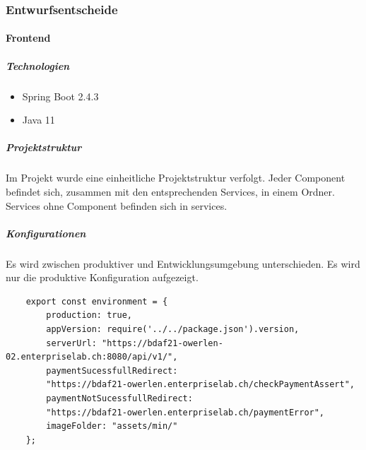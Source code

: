\subsubsection{Entwurfsentscheide}
\paragraph{Frontend}
\subparagraph{Technologien}
\begin{itemize}
	\item Spring Boot 2.4.3
	\item Java 11
\end{itemize}
\subparagraph{Projektstruktur}
Im Projekt wurde eine einheitliche Projektstruktur verfolgt. Jeder Component befindet sich, zusammen mit den entsprechenden Services, in einem Ordner. Services ohne Component befinden sich in \glqq services\grqq{}. 
\subparagraph{Konfigurationen}
 Es wird zwischen produktiver und Entwicklungsumgebung unterschieden. Es wird nur die produktive Konfiguration aufgezeigt. 
\begin{verbatim}
	export const environment = {
		production: true, 
		appVersion: require('../../package.json').version,
		serverUrl: "https://bdaf21-owerlen-02.enterpriselab.ch:8080/api/v1/",
		paymentSucessfullRedirect: 
		"https://bdaf21-owerlen.enterpriselab.ch/checkPaymentAssert", 
		paymentNotSucessfullRedirect: 
		"https://bdaf21-owerlen.enterpriselab.ch/paymentError", 
		imageFolder: "assets/min/"
	};
	
\end{verbatim}
